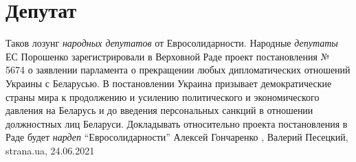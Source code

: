  
 
 
 
 
\chapter{Депутат}

Таков лозунг \emph{народных депутатов} от Евросолидарности.  Народные
\emph{депутаты} ЕС Порошенко зарегистрировали в Верховной Раде проект
постановления № 5674 о заявлении парламента о прекращении любых дипломатических
отношений Украины с Беларусью. В постановлении Украина призывает
демократические страны мира к продолжению и усилению политического и
экономического давления на Беларусь и до введения персональных санкций в
отношении должностных лиц Беларуси. Докладывать относительно проекта
постановления в Раде будет \emph{нардеп} \enquote{Евросолидарности} Алексей
Гончаренко
, 
Валерий Песецкий, strana.ua, 24.06.2021

